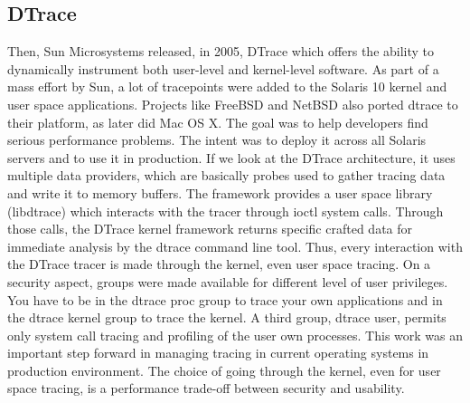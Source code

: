 \subsection{DTrace}
Then, Sun Microsystems released, in 2005, DTrace \cite{dtrace} which offers the
ability to dynamically instrument both user-level and kernel-level software. As
part of a mass effort by Sun, a lot of tracepoints were added to the Solaris 10
kernel and user space applications. Projects like FreeBSD and NetBSD also ported
dtrace to their platform, as later did Mac OS X. The goal was to help developers
find serious performance problems. The intent was to deploy it across all
Solaris servers and to use it in production.  If we look at the DTrace
architecture, it uses multiple data providers, which are basically probes used
to gather tracing data and write it to memory buffers.  The framework provides a
user space library (libdtrace) which interacts with the tracer through ioctl
system calls. Through those calls, the DTrace kernel framework returns specific
crafted data for immediate analysis by the dtrace command line tool. Thus, every
interaction with the DTrace tracer is made through the kernel, even user space
tracing.  On a security aspect, groups were made available for different level
of user privileges. You have to be in the dtrace proc group to trace your own
applications and in the dtrace kernel group to trace the kernel.  A third group,
dtrace user, permits only system call tracing and profiling of the user own
processes.  This work was an important step forward in managing tracing in
current operating systems in production environment. The choice of going through
the kernel, even for user space tracing, is a performance trade-off between
security and usability.

